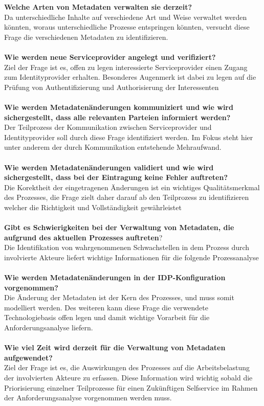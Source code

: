 \documentclass[a4paper, fontsize=11pt]{scrartcl}
\begin{document}
\textbf{Welche Arten von Metadaten verwalten sie derzeit?}\\
Da unterschiedliche Inhalte auf verschiedene Art und Weise verwaltet werden könnten, woraus unterschiedliche Prozesse entspringen könnten, versucht diese Frage die verschiedenen Metadaten zu identifizieren.\\\\
\textbf{Wie werden neue Serviceprovider angelegt und verifiziert?}\\
Ziel der Frage ist es, offen zu legen interessierte Serviceprovider einen Zugang zum Identityprovider erhalten. Besonderes Augenmerk ist dabei zu legen auf die Prüfung von Authentifizierung und Authorisierung der Interessenten\\\\
\textbf{Wie werden Metadatenänderungen kommuniziert und wie wird sichergestellt, dass alle relevanten Parteien informiert werden?}\\
Der Teilprozess der Kommunikation zwischen Serviceprovider und Identityprovider soll durch diese Frage identifiziert werden. Im Fokus steht hier unter anderem der durch Kommunikation entstehende Mehraufwand.\\\\
\textbf{Wie werden Metadatenänderungen validiert und wie wird sichergestellt, dass bei der Eintragung keine Fehler auftreten?}\\
Die Korektheit der eingetragenen Änderungen ist ein wichtiges Qualitätsmerkmal des Prozesses, die Frage zielt daher darauf ab den Teilprozess zu identifizieren welcher die Richtigkeit und Vollständigkeit gewährleistet\\\\
\textbf{Gibt es Schwierigkeiten bei der Verwaltung von Metadaten, die aufgrund des aktuellen Prozesses auftreten}?\\
 Die Identifikation von wahrgenommenen Schwachstellen in dem Prozess durch involvierte Akteure liefert wichtige Informationen für die folgende Prozessanalyse\\\\
\textbf{Wie werden Metadatenänderungen in der IDP-Konfiguration vorgenommen?}\\
Die Änderung der Metadaten ist der Kern des Prozesses, und muss somit modelliert werden. Des weiteren kann diese Frage die verwendete Technologiebasis offen legen und damit wichtige Vorarbeit für die Anforderungsanalyse liefern.\\\\
\textbf{Wie viel Zeit wird derzeit für die Verwaltung von Metadaten aufgewendet?}\\
Ziel der Frage ist es, die Auswirkungen des Prozesses auf die Arbeitsbelastung der involvierten Akteure zu erfassen. Diese Information wird wichtig sobald die Priorisierung einzelner Teilprozesse für einen Zukünftigen Selfservice im Rahmen der Anforderungsanalyse vorgenommen werden muss.\\\\
\end{document}
